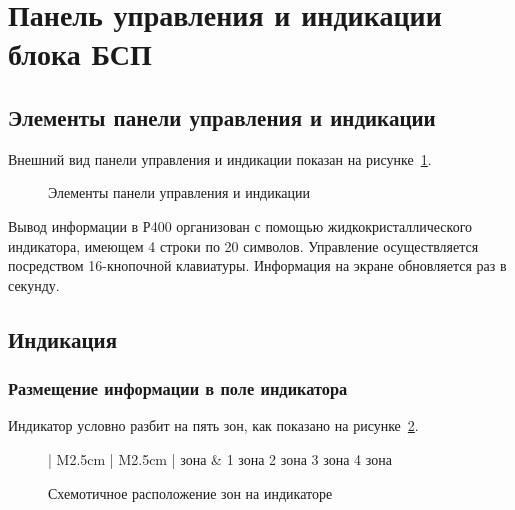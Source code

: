 \section{Панель управления и индикации блока БСП} \label{sec:overview}


\subsection{Элементы панели управления и индикации}

Внешний вид панели управления и индикации показан на рисунке~\ref{fig:pi}.

\begin{figure}[H]
	
	\caption{Элементы панели управления и индикации}
	\label{fig:pi}
\end{figure}

Вывод информации в Р400 организован с помощью жидкокристаллического индикатора, имеющем 4 строки по 20 символов. Управление осуществляется посредством 16-кнопочной клавиатуры. Информация на экране обновляется раз в секунду.


\subsection{Индикация} 


\subsubsection{Размещение информации в поле индикатора}

Индикатор условно разбит на пять зон, как показано на рисунке~\ref{fig:overview_ind}.

\begin{figure}[H]
	\centering
	
	\begin{tabular}{| M{2.5cm} | M{2.5cm} |}	
		 зона	& 1 зона 				\tabularnewline \hline 
	     {2 зона}	\tabularnewline \hline
	     {3 зона}	\tabularnewline \hline
	     {4 зона}	\tabularnewline 
	    \lasthline 
	\end{tabular} 
	
	\caption{Схемотичное расположение зон на индикаторе} 
	\label{fig:overview_ind}
\end{figure}

